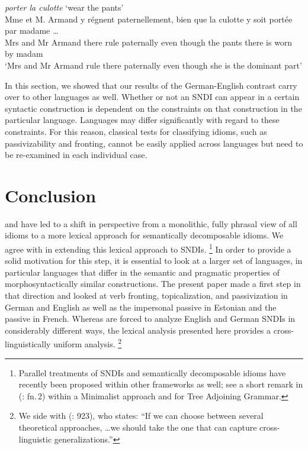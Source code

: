 \documentclass[output=paper]{langsci/langscibook}
\begin{document}
\ea \textit{porter la culotte} `wear the pants'\\
\gll Mme et M. Armand y r\'egnent paternellement, bien que la culotte y soit port\'ee par
madame {\ldots}\\
Mrs and Mr Armand there rule paternally even though the pants there is worn by madam\\
\glt `Mrs and Mr Armand rule there paternally even though she is the dominant part'\label{fr-culotte}
\z


In this section, we showed that our results of the German-English contrast carry over to other languages as well. Whether or not an SNDI can appear in a certain syntactic construction is dependent on the constraints on that construction in the particular language. Languages may differ significantly with regard to these constraints. For this reason, classical tests for classifying idioms, such as passivizability and fronting, cannot be easily applied across languages but need to be re-examined in each individual case.



\section{Conclusion}
\label{Sec-Conclusion}

\cite{Wasow:al:83} and \cite{Nunberg1994} have led to a shift in perspective from a monolithic, 
fully phrasal view of all idioms to a more lexical approach for  semantically decomposable idioms. We agree with \cite{kaysagidioms} in extending this lexical approach to SNDIs.%
\footnote{Parallel treatments of SNDIs and semantically decomposable idioms have recently been proposed within other frameworks as well; see a short remark in \citeauthor{Harley:Stone:13} (\citeyear{Harley:Stone:13}: fn.\,2) within a Minimalist approach and \cite{Lichte:Kallmeyer:16} for Tree Adjoining Grammar.}
%
In order to provide a solid motivation for this step, it is essential to look at a larger set of languages, in particular languages that differ in the semantic and pragmatic properties of morphosyntactically similar constructions. The present paper made a first step in that direction and looked at verb fronting,  topicalization, and passivization in German and English as well as the impersonal passive in Estonian and the passive in French. Whereas \cite{Nunberg1994} are forced to analyze English and German SNDIs in considerably different ways, the lexical analysis presented here provides a cross-linguistically uniform analysis.%
\footnote{We side with \citeauthor{Mueller:13Unifying} (\citeyear{Mueller:13Unifying}: 923), who states: ``If we can choose between several theoretical approaches, \ldots we should take the one that can capture cross-linguistic generalizations.''}
\end{document}

